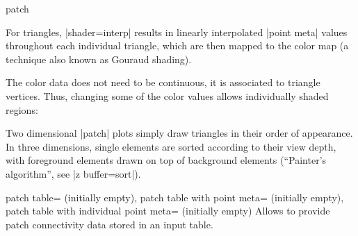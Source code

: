 {\begin{plottype}[/pgfplots]{patch}
\begin{codeexample}[]
\end{codeexample}
	\noindent For triangles, |shader=interp| results in linearly interpolated |point meta| values throughout each individual triangle, which are then mapped to the color map (a technique also known as Gouraud shading).

	The color data does not need to be continuous, it is associated to triangle vertices. Thus, changing some of the color values allows individually shaded regions:
\begin{codeexample}[]
\end{codeexample}
	
	Two dimensional |patch| plots simply draw triangles in their order of appearance. In three dimensions, single elements are sorted according to their view depth, with foreground elements drawn on top of background elements (``Painter's algorithm'', see |z buffer=sort|).

\begin{pgfplotskeylist}{%
	patch table= (initially empty),%
	patch table with point meta= (initially empty),%
	patch table with individual point meta= (initially empty)%
}
	Allows to provide patch connectivity data stored in an input table.


\end{pgfplotskeylist}
\end{plottype}}
